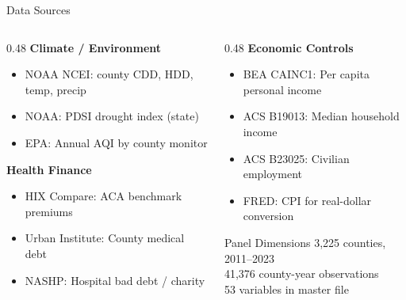 \documentclass[aspectratio=169,11pt]{beamer}
\newcommand{\tealtext}[1]{{\color{Teal}#1}}
\begin{document}
\begin{frame}{Data Sources}
  \begin{columns}[T]
    \begin{column}{0.48\textwidth}
      \textbf{Climate / Environment}
      \begin{itemize}
        \item \tealtext{NOAA NCEI:} county CDD, HDD, temp, precip
        \item \tealtext{NOAA:} PDSI drought index (state)
        \item \tealtext{EPA:} Annual AQI by county monitor
      \end{itemize}
      \vspace{0.5em}
      \textbf{Health Finance}
      \begin{itemize}
        \item \tealtext{HIX Compare:} ACA benchmark premiums
        \item \tealtext{Urban Institute:} County medical debt
        \item \tealtext{NASHP:} Hospital bad debt / charity
      \end{itemize}
    \end{column}
    \begin{column}{0.48\textwidth}
      \textbf{Economic Controls}
      \begin{itemize}
        \item \tealtext{BEA CAINC1:} Per capita personal income
        \item \tealtext{ACS B19013:} Median household income
        \item \tealtext{ACS B23025:} Civilian employment
        \item \tealtext{FRED:} CPI for real-dollar conversion
      \end{itemize}
      \vspace{0.5em}
      \begin{block}{Panel Dimensions}
        \small 3,225 counties, 2011--2023\\
        41,376 county-year observations\\
        53 variables in master file
      \end{block}
    \end{column}
  \end{columns}
\end{frame}
\end{document}
